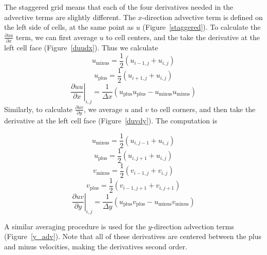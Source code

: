 \documentclass[12pt]{article}
\begin{document}
\FloatBarrier
The staggered grid means that each of the four derivatives needed in the advective terms are slightly different.  The $x$-direction advective term is defined on the left side of cells, at the same point as $u$ (Figure~\ref{staggered}).  To calculate the $\frac{\partial uu}{\partial x}$ term, we can first average $u$ to cell centers, and the take the derivative at the left cell face (Figure~\ref{duudx}).  Thus we calculate
\[ u_{\text{minus}} = \frac{1}{2}\left(u_{i-1,j}+u_{i,j} \right) \]
\[ u_{\text{plus}} = \frac{1}{2}\left(u_{i+1,j}+u_{i,j} \right) \]
\[ \left.\frac{\partial uu}{\partial x}\right|_{i,j} = \frac{1}{\Delta x}\left( u_{\text{plus}}u_{\text{plus}} - u_{\text{minus}}u_{\text{minus}}\right)\]
Similarly, to calculate $\frac{\partial uv}{\partial y}$, we average $u$ and $v$ to cell corners, and then take the derivative at the left cell face (Figure~\ref{duvdy}).  The computation is

\[ u_{\text{minus}} = \frac{1}{2}\left(u_{i,j-1}+u_{i,j} \right) \]
\[ u_{\text{plus}} = \frac{1}{2}\left(u_{i,j+1}+u_{i,j} \right) \]
\[ v_{\text{minus}} = \frac{1}{2}\left(v_{i-1,j}+v_{i,j} \right) \]
\[ v_{\text{plus}} = \frac{1}{2}\left(v_{i-1,j+1}+v_{i,j+1} \right) \]
\[ \left.\frac{\partial uv}{\partial y}\right|_{i,j} = \frac{1}{\Delta y}\left( u_{\text{plus}}v_{\text{plus}} - u_{\text{minus}}v_{\text{minus}}\right)\]

A similar averaging procedure is used for the $y$-direction advection terms (Figure~\ref{y_adv}).  Note that all of these derivatives are centered between the plus and minus velocities, making the derivatives second order.


\begin{center}
\begin{figure*}[h]
\center
{}  
\caption{First derivatives for $x$ direction advection term.}
\label{x_adv}
\end{figure*}
\end{center}

\begin{center}
\begin{figure*}
\center
{}  
\caption{First derivatives for $x$ direction advection term.}
\label{y_adv}
\end{figure*}
\end{center}
\end{document}
